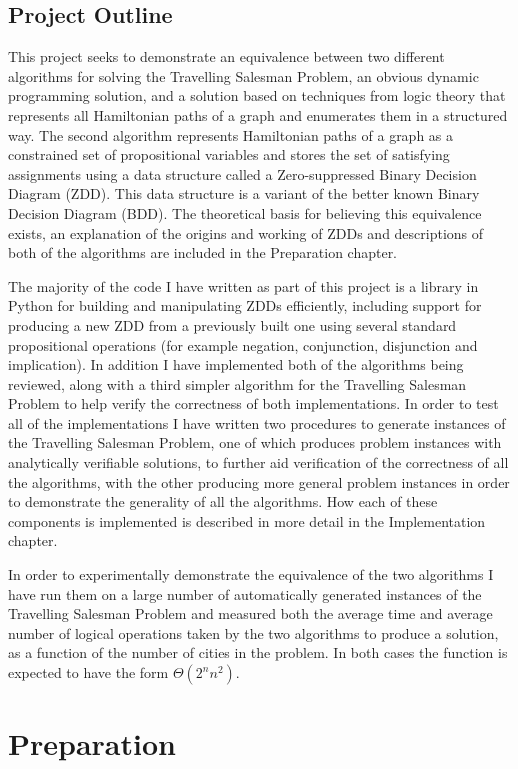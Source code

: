 \documentclass[12pt,a4paper,twoside,openright]{report}
\begin{document}
\section{Project Outline}
This project seeks to demonstrate an equivalence between two different algorithms for solving the Travelling Salesman Problem, an obvious dynamic programming solution, and a solution based on techniques from logic theory that represents all Hamiltonian paths of a graph and enumerates them in a structured way. The second algorithm represents Hamiltonian paths of a graph as a constrained set of propositional variables and stores the set of satisfying assignments using a data structure called a Zero-suppressed Binary Decision Diagram (ZDD). This data structure is a variant of the better known Binary Decision Diagram (BDD). The theoretical basis for believing this equivalence exists, an explanation of the origins and working of ZDDs and descriptions of both of the algorithms are included in the Preparation chapter.

The majority of the code I have written as part of this project is a library in Python for building and manipulating ZDDs efficiently, including support for producing a new ZDD from a previously built one using several standard propositional operations (for example negation, conjunction, disjunction and implication). In addition I have implemented both of the algorithms being reviewed, along with a third simpler algorithm for the Travelling Salesman Problem to help verify the correctness of both implementations. In order to test all of the implementations I have written two procedures to generate instances of the Travelling Salesman Problem, one of which produces problem instances with analytically verifiable solutions, to further aid verification of the correctness of all the algorithms, with the other producing more general problem instances in order to demonstrate the generality of all the algorithms. How each of these components is implemented is described in more detail in the Implementation chapter.

In order to experimentally demonstrate the equivalence of the two algorithms I have run them on a large number of automatically generated instances of the Travelling Salesman Problem and measured both the average time and average number of logical operations taken by the two algorithms to produce a solution, as a function of the number of cities in the problem. In both cases the function is expected to have the form $\Theta(2^nn^2)$.

\chapter{Preparation}
\end{document}
